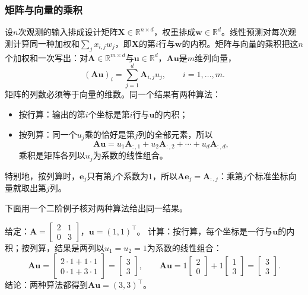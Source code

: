 \subsubsection{矩阵与向量的乘积}
\label{sec:prelim-matrix-records-prediction}

设$n$次观测的输入排成设计矩阵$\bm X\in\mathbb R^{n\times d}$，权重排成$\bm w\in\mathbb R^d$。线性预测对每次观测计算同一种加权和$\sum_j x_{i,j}w_j$，即$\bm X$的第$i$行与$\bm w$的内积。矩阵与向量的乘积把这$n$个加权和一次写出：对$\bm A\in\mathbb R^{m\times d}$与$\bm u\in\mathbb R^d$，$\bm A\bm u$是$m$维列向量，
\begin{equation}
 (\bm A\bm u)_i=\sum_{j=1}^d\bm A_{i,j}u_j,\qquad i=1,\ldots,m.
 \label{eq:prelim-matrix-prediction}
\end{equation}
矩阵的列数必须等于向量的维数。同一个结果有两种算法：
\begin{itemize}
 \item 按行算：输出的第$i$个坐标是第$i$行与$\bm u$的内积；
 \item 按列算：同一个$u_j$乘的恰好是第$j$列的全部元素，所以
 \[
  \bm A\bm u=u_1\bm A_{:,1}+u_2\bm A_{:,2}+\cdots+u_d\bm A_{:,d},
 \]
 乘积是矩阵各列以$u_j$为系数的线性组合。
\end{itemize}
特别地，按列算时，$\bm e_j$只有第$j$个系数为$1$，所以$\bm A\bm e_j=\bm A_{:,j}$：乘第$j$个标准坐标向量就取出第$j$列。

下面用一个二阶例子核对两种算法给出同一结果。
\begin{example}[按行与按列计算矩阵与向量的乘积]
\label{ex:ls-matrix-vector-rows-columns}
给定：$\bm A=\left[\begin{smallmatrix}2&1\\0&3\end{smallmatrix}\right]$，$\bm u=(1,1)^\top$。
计算：按行算，每个坐标是一行与$\bm u$的内积；按列算，结果是两列以$u_1=u_2=1$为系数的线性组合：
\[
 \bm A\bm u
 =\begin{bmatrix}2\cdot1+1\cdot1\\0\cdot1+3\cdot1\end{bmatrix}
 =\begin{bmatrix}3\\3\end{bmatrix},
 \qquad
 \bm A\bm u=1\begin{bmatrix}2\\0\end{bmatrix}+1\begin{bmatrix}1\\3\end{bmatrix}
 =\begin{bmatrix}3\\3\end{bmatrix}.
\]
结论：两种算法都得到$\bm A\bm u=(3,3)^\top$。
\end{example}

